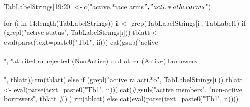 \begin{Schunk}
\begin{Sinput}
TabLabelStrings[19:20] <- c("active.*race arms$", "acti.*other arms$")
\end{Sinput}
\end{Schunk}
\begin{Sinput}
for (i in 14:length(TabLabelStrings)) {
  ii <- grep(TabLabelStrings[i], TabLabel1)
  if (grepl("active status", TabLabelStrings[i])){
   tblatt <- eval(parse(text=paste0("Tb1", ii)))
   cat(gsub("active\\\\", "attrited or rejected (NonActive) and other (Active) borrowers\\\\", 
     tblatt)) 
   rm(tblatt)
  } else
  if (grepl("active ra|acti.*o", TabLabelStrings[i])) {
   tblatt <- eval(parse(text=paste0("Tb1", ii)))
   cat(#gsub("active members", "non-active borrowers", 
     tblatt
     #)
     ) 
    rm(tblatt)
  } else
   cat(eval(parse(text=paste0("Tb1", ii))))
}
\end{Sinput}
